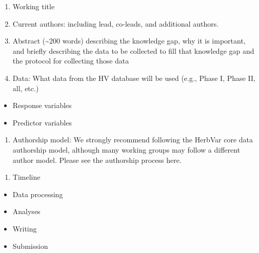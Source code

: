 \documentclass[
  letterpaper,
  oneside,
  open=any]{scrbook}
\providecommand{\tightlist}{%
  \setlength{\itemsep}{0pt}\setlength{\parskip}{0pt}}\usepackage{longtable,booktabs,array}
\begin{document}
\begin{enumerate}
\def\labelenumi{\roman{enumi}.}
\tightlist
\item
  Working title
\item
  Current authors: including lead, co-leads, and additional authors.
\item
  Abstract (\textasciitilde200 words) describing the knowledge gap, why
  it is important, and briefly describing the data to be collected to
  fill that knowledge gap and the protocol for collecting those data
\item
  Data: What data from the HV database will be used (e.g., Phase I,
  Phase II, all, etc.)
\end{enumerate}

\begin{itemize}
\tightlist
\item
  Response variables
\item
  Predictor variables
\end{itemize}

\begin{enumerate}
\def\labelenumi{\alph{enumi}.}
\setcounter{enumi}{21}
\tightlist
\item
  Authorship model: We strongly recommend following the HerbVar core
  data authorship model, although many working groups may follow a
  different author model. Please see the authorship process here.
\end{enumerate}

\begin{enumerate}
\def\labelenumi{\roman{enumi}.}
\setcounter{enumi}{5}
\tightlist
\item
  Timeline
\end{enumerate}

\begin{itemize}
\tightlist
\item
  Data processing
\item
  Analyses
\item
  Writing
\item
  Submission
\end{itemize}
\end{document}
